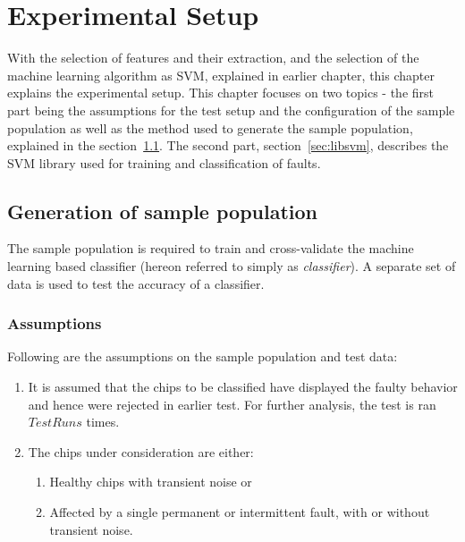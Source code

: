 \chapter{Experimental Setup}
\label{chap:chapter5}
With the selection of features and their extraction, and the selection of the machine learning algorithm as SVM, explained in earlier chapter, this chapter explains the experimental setup. This chapter focuses on two topics - the first part being the assumptions for the test setup and the configuration of the sample population as well as the method used to generate the sample population, explained in the section~\ref{sec:gsp}. The second part, section~\ref{sec:libsvm}, describes the SVM library used for training and classification of faults.

\section{Generation of sample population}
\label{sec:gsp}

The sample population is required to train and cross-validate the machine learning based classifier (hereon referred to simply as \emph{classifier}). A separate set of data is used to test the accuracy of a classifier.
\subsection{Assumptions}
\label{sec:gsp:assumptions}
Following are the assumptions on the sample population and test data:
\begin{enumerate}
  \item It is assumed that the chips to be classified have displayed the faulty behavior and hence were rejected in earlier test. For further analysis, the test is ran $TestRuns$ times. 
  \item The chips under consideration are either:
		  \begin{enumerate}
    		\item Healthy chips with transient noise or
    		\item Affected by a single permanent or intermittent fault, with or without transient noise.
 		 \end{enumerate}
\end{enumerate}

